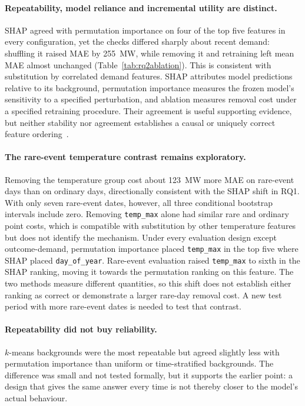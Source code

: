 \documentclass[11pt,a4paper]{article}
\newcommand{\feat}[1]{\texttt{#1}}
\begin{document}
\paragraph{Repeatability, model reliance and incremental utility are distinct.} SHAP agreed with permutation importance on four of the top five features in every configuration, yet the checks differed sharply about recent demand: shuffling it raised MAE by 255~MW, while removing it and retraining left mean MAE almost unchanged (Table~\ref{tab:rq2ablation}). This is consistent with substitution by correlated demand features. SHAP attributes model predictions relative to its background, permutation importance measures the frozen model's sensitivity to a specified perturbation, and ablation measures removal cost under a specified retraining procedure. Their agreement is useful supporting evidence, but neither stability nor agreement establishes a causal or uniquely correct feature ordering~\cite{krishna2022}.

\paragraph{The rare-event temperature contrast remains exploratory.} Removing the temperature group cost about 123~MW more MAE on rare-event days than on ordinary days, directionally consistent with the SHAP shift in RQ1. With only seven rare-event dates, however, all three conditional bootstrap intervals include zero. Removing \feat{temp\_max} alone had similar rare and ordinary point costs, which is compatible with substitution by other temperature features but does not identify the mechanism. Under every evaluation design except outcome-demand, permutation importance placed \feat{temp\_max} in the top five where SHAP placed \feat{day\_of\_year}. Rare-event evaluation raised \feat{temp\_max} to sixth in the SHAP ranking, moving it towards the permutation ranking on this feature. The two methods measure different quantities, so this shift does not establish either ranking as correct or demonstrate a larger rare-day removal cost. A new test period with more rare-event dates is needed to test that contrast.

\paragraph{Repeatability did not buy reliability.} $k$-means backgrounds were the most repeatable but agreed slightly less with permutation importance than uniform or time-stratified backgrounds. The difference was small and not tested formally, but it supports the earlier point: a design that gives the same answer every time is not thereby closer to the model's actual behaviour.
\end{document}
